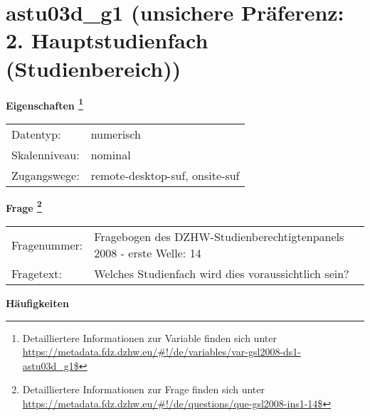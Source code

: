 
    \setcounter{footnote}{0}

    \vspace*{-1.8cm}
	\section{astu03d\_g1 (unsichere Präferenz: 2. Hauptstudienfach (Studienbereich))}
	\label{section:astu03d_g1}



    \vspace*{0.5cm}
    \noindent\textbf{Eigenschaften
	\footnote{Detailliertere Informationen zur Variable finden sich unter
		\url{https://metadata.fdz.dzhw.eu/\#!/de/variables/var-gsl2008-ds1-astu03d_g1$}}}\\
	\begin{tabularx}{\hsize}{@{}lX}
	Datentyp: & numerisch \\
	Skalenniveau: & nominal \\
	Zugangswege: &
	  remote-desktop-suf, 
	  onsite-suf
 \\
    \end{tabularx}



				\vspace*{0.5cm}
                \noindent\textbf{Frage
	                \footnote{Detailliertere Informationen zur Frage finden sich unter
		              \url{https://metadata.fdz.dzhw.eu/\#!/de/questions/que-gsl2008-ins1-14$}}}\\
				\begin{tabularx}{\hsize}{@{}lX}
					Fragenummer: &
					  Fragebogen des DZHW-Studienberechtigtenpanels 2008 - erste Welle:
					  14
 \\
					Fragetext: & Welches Studienfach wird dies voraussichtlich sein? \\
				\end{tabularx}





        		\vspace*{0.5cm}
                \noindent\textbf{Häufigkeiten}

